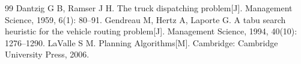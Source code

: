 {}
\begin{thebibliography}{99}
 Dantzig G B, Ramser J H. The truck dispatching problem[J]. Management Science, 1959, 6(1): 80--91.
 Gendreau M, Hertz A, Laporte G. A tabu search heuristic for the vehicle routing problem[J]. Management Science, 1994, 40(10): 1276--1290.
 LaValle S M. Planning Algorithms[M]. Cambridge: Cambridge University Press, 2006.
\end{thebibliography}
